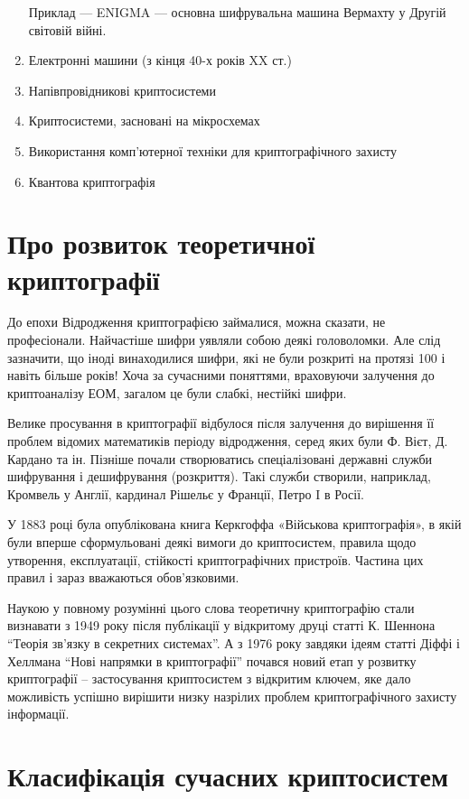 \begin{enumerate}
        Приклад --- ENIGMA --- основна шифрувальна машина Вермахту
        у Другій світовій війні.
    \item Електронні машини (з кінця 40-х років XX ст.)
    \item Напівпровідникові криптосистеми
    \item Криптосистеми, засновані на мікросхемах
    \item Використання комп'ютерної техніки для криптографічного захисту
    \item Квантова криптографія
\end{enumerate}

\section{Про розвиток теоретичної криптографії}

До епохи Відродження криптографією займалися, можна сказати, не професіонали.
Найчастіше шифри уявляли  собою деякі головоломки. Але слід зазначити, що іноді
винаходилися шифри, які не були розкриті на протязі  100 і навіть більше років!
Хоча за сучасними  поняттями,  враховуючи залучення до криптоаналізу ЕОМ,
загалом це були  слабкі, нестійкі шифри.

Велике просування в криптографії відбулося після залучення до вирішення її
проблем  відомих математиків періоду відродження, серед яких  були Ф. Вієт, Д.
Кардано та ін. Пізніше почали створюватись спеціалізовані державні служби
шифрування і дешифрування (розкриття). Такі служби створили, наприклад,
Кромвель у Англії, кардинал Рішельє у Франції, Петро I  в Росії. 

У 1883 році була опублікована  книга Керкгоффа «Військова криптографія», в якій 
були вперше сформульовані деякі вимоги до криптосистем, правила щодо утворення,
експлуатації, стійкості  криптографічних пристроїв. Частина цих правил і зараз
вважаються обов'язковими. 

Наукою у повному розумінні цього слова теоретичну  криптографію стали визнавати
з 1949 року після публікації у відкритому друці  статті К. Шеннона ``Теорія
зв'язку в секретних системах''. А з 1976 року завдяки ідеям
статті  Діффі і Хеллмана ``Нові напрямки в криптографії'' почався новий  етап у
розвитку  криптографії – застосування криптосистем з відкритим ключем, яке дало
можливість успішно вирішити низку назрілих  проблем криптографічного захисту
інформації.

\section{Класифікація сучасних  криптосистем}

